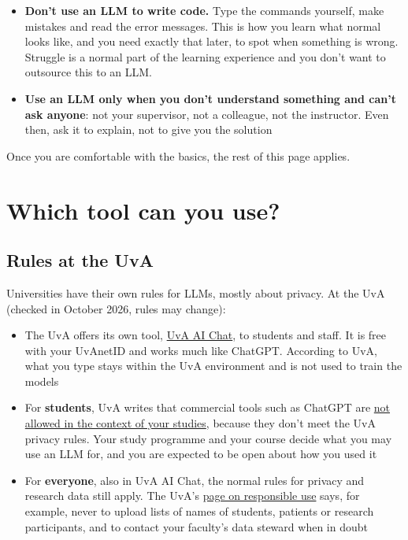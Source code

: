 \documentclass[
  letterpaper,
  DIV=11,
  numbers=noendperiod]{scrreprt}
\providecommand{\tightlist}{%
  \setlength{\itemsep}{0pt}\setlength{\parskip}{0pt}}
\begin{document}
\begin{itemize}
\tightlist
\item
  \textbf{Don't use an LLM to write code.} Type the commands yourself,
  make mistakes and read the error messages. This is how you learn what
  normal looks like, and you need exactly that later, to spot when
  something is wrong. Struggle is a normal part of the learning
  experience and you don't want to outsource this to an LLM.
\item
  \textbf{Use an LLM only when you don't understand something and can't
  ask anyone}: not your supervisor, not a colleague, not the instructor.
  Even then, ask it to explain, not to give you the solution
\end{itemize}

Once you are comfortable with the basics, the rest of this page applies.

\section{Which tool can you use?}\label{which-tool-can-you-use}

\subsection{Rules at the UvA}\label{rules-at-the-uva}

Universities have their own rules for LLMs, mostly about privacy. At the
UvA (checked in October 2026, rules may change):

\begin{itemize}
\tightlist
\item
  The UvA offers its own tool,
  \href{https://www.uva.nl/en/about-the-uva/about-the-university/ai/ai-in-education/uva-ai-chat/uva-ai-chat.html}{UvA
  AI Chat}, to students and staff. It is free with your UvAnetID and
  works much like ChatGPT. According to UvA, what you type stays within
  the UvA environment and is not used to train the models
\item
  For \textbf{students}, UvA writes that commercial tools such as
  ChatGPT are
  \href{https://student.uva.nl/en/information/ai-tools-and-your-studies}{not
  allowed in the context of your studies}, because they don't meet the
  UvA privacy rules. Your study programme and your course decide what
  you may use an LLM for, and you are expected to be open about how you
  used it
\item
  For \textbf{everyone}, also in UvA AI Chat, the normal rules for
  privacy and research data still apply. The UvA's
  \href{https://www.uva.nl/en/about-the-uva/about-the-university/ai/ai-in-education/uva-ai-chat/uva-ai-chat-rai.html}{page
  on responsible use} says, for example, never to upload lists of names
  of students, patients or research participants, and to contact your
  faculty's data steward when in doubt
\end{itemize}
\end{document}
